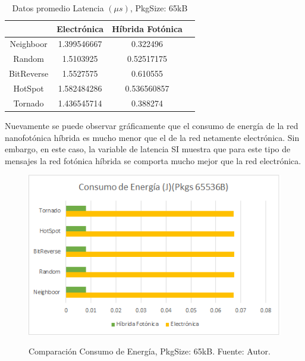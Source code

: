 \begin{table}[H]
\centering
\begin{tabular}{|c|c|c|c|}
\hline
&Electrónica&Híbrida Fotónica\\
\hline
Neighboor&1.399546667&0.322496\\
Random&1.5103925&0.52517175\\
BitReverse&1.5527575&0.610555\\
HotSpot&1.582484286&0.536560857\\
Tornado&1.436545714&0.388274\\
\hline
\end{tabular}
\caption{Datos promedio Latencia $(\mu s)$, PkgSize: 65kB}
\label{tb:lall65k}
\end{table}

Nuevamente se puede observar gráficamente que el consumo de energía de la red
nanofotónica híbrida es mucho menor que el de la red netamente electrónica.
Sin embargo, en este caso, la variable de latencia SI muestra que 
para este tipo de mensajes la red fotónica híbrida se comporta mucho mejor 
que la red electrónica.

\begin{figure}[H]
\caption{Comparación Consumo de Energía, PkgSize: 65kB. Fuente: Autor.}
\centering
\includegraphics[width=1.0\textwidth,natwidth=483,natheight=306]{figs/E65k.png}
\label{fig:e65k}
\end{figure} 

